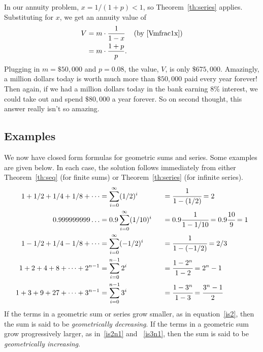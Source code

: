 In our annuity problem, $x=1/(1+p) < 1$, so Theorem~\ref{th:series} applies.
Substituting for $x$, we get an annuity value of
\begin{align*}
V &= m\cdot \frac{1}{1-x} & \text{(by \eqref{Vmfrac1x})}\\
  &= m\cdot \frac{1 + p}{p}.
\end{align*}
Plugging in $m = \$50,000$ and $p = 0.08$, the value, $V$, is only
$\$675,000$.  Amazingly, a million dollars today is worth much more than
$\$50,000$ paid every year forever!  Then again, if we had a million
dollars today in the bank earning 8\% interest, we could take out and
spend $\$80,000$ a year forever.  So on second thought, this answer really
isn't so amazing.

\iffalse
\subsection{Examples}

We now have closed form formulas for geometric sums and series.  Some
examples are given below.  In each case, the solution follows immediately
from either Theorem~\ref{th:seq} (for finite sums) or
Theorem~\ref{th:series} (for infinite series).
\begin{alignat}{3}
1 + 1/2 + 1/4 + 1/8 + \cdots &=\sum_{i=0}^\infty (1/2)^i
                             &\;\;&=\cfrac{1}{1-(1/2)}
                               =2 \label{is2}
\\
0.999999999\dots             &=0.9 \sum_{i=0}^{\infty} (1/10)^i
                             &&=0.9\cfrac{1}{1-1/10}
                               =0.9\cfrac{10}{9} 
                               =1 \label{is1}
\\
1 - 1/2 + 1/4 - 1/8 + \cdots &=\sum_{i=0}^\infty (-1/2)^i
                             &&=\cfrac{1}{1-(-1/2)}
                               =2/3 \label{is23}
\\
1 + 2 + 4 + 8 + \cdots + 2^{n-1} &=\sum_{i=0}^{n-1} 2^i
                                 &&=\cfrac{1 - 2^n}{1 - 2}
                                   =2^n - 1 \label{is2n1}
\\
1 + 3 + 9 + 27 + \cdots + 3^{n-1} &=\sum_{i=0}^{n-1} 3^i
                                  &&=\cfrac{1 - 3^n}{1 - 3}
                                    =\cfrac{3^n - 1}{2} \label{is3n1}
\end{alignat}
If the terms in a geometric sum or series grow smaller, as in
equation~\eqref{is2}, then the sum is said to be {\em geometrically
decreasing}.  If the terms in a geometric sum grow progressively larger,
as in~\eqref{is2n1} and ~\eqref{is3n1}, then the sum is said to be {\em
geometrically increasing}.

